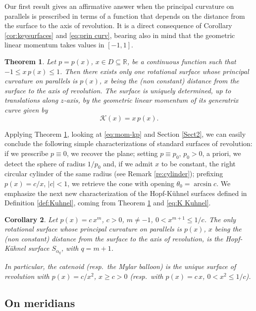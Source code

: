 \documentclass[leqno,11pt]{amsart}
\def\R{\mathbb{R}}
\newtheorem{theorem}{Theorem}[section]
\newtheorem{corollary}[theorem]{Corollary}
\theoremstyle{definition}
\numberwithin{equation}{section}
\begin{document}
Our first result gives an affirmative answer when the principal curvature on parallels is prescribed in terms of a function that depends on the distance from the surface to the axis of revolution. It is a direct consequence of Corollary \ref{cor:keysurfaces} and \eqref{eq:prin curv}, bearing also in mind that the geometric linear momentum takes values in $[-1,1]$.
\begin{theorem}
	\label{th:Prescribe_kp}
	Let $p=p(x)$, $x\in D \subseteq \R $, be a continuous function such that $-1 \leq x\, p(x) \leq 1$.
	Then there exists only one rotational surface whose principal curvature on parallels is $p(x)$, 
	$x$ being the (non constant) distance from the surface to the axis of revolution.
	The surface is uniquely determined, up to translations along $z$-axis, by the geometric linear momentum of its generatrix curve given by
	\begin{equation}\label{eq:mom-kp}
		 \mathcal K (x) =x \, p(x).
	\end{equation}
\end{theorem}
Applying Theorem \ref{th:Prescribe_kp}, looking at \eqref{eq:mom-kp} and Section \ref{Sect2}, we can easily conclude the following simple characterizations of standard surfaces of revolution: if we prescribe $p\equiv 0$, we recover the plane; setting $p \equiv p_0$, $p_0>0$, a priori, we detect the sphere of radius $1/p_0$ and, if we admit $x$ to be constant, the right circular cylinder of the same radius (see Remark \ref{re:cylinder}); prefixing $p(x)=c/x$, $|c|<1$, we retrieve the cone with opening $\theta_0 =\arcsin c$. We emphasize the next new characterization of the Hopf-Kühnel surfaces defined in Definition \ref{def:Kuhnel}, coming from Theorem \ref{th:Prescribe_kp} and \eqref{eq:K Kuhnel}.
\begin{corollary}\label{cor:Hopf Kuhnel}
	Let $p(x)=c\, x^m$, $c>0$, $m\neq -1$, $0<x^{m+1} \leq 1/c$. The only rotational surface whose principal curvature on parallels is $p(x)$, $x$ being the (non constant) distance from the surface to the axis of revolution, is the Hopf-Kühnel surface $S_{\alpha_{q}}$, with $q=m+1$. 
	
	In particular, the catenoid (resp.\ the Mylar balloon) is the unique surface of revolution with $p(x)=c/x^2$, $x \geq c>0$ (resp.\ with $p(x)=c\,x$, $0<x^2\leq1/c$).
\end{corollary} 


\subsection{On meridians}
\end{document}
